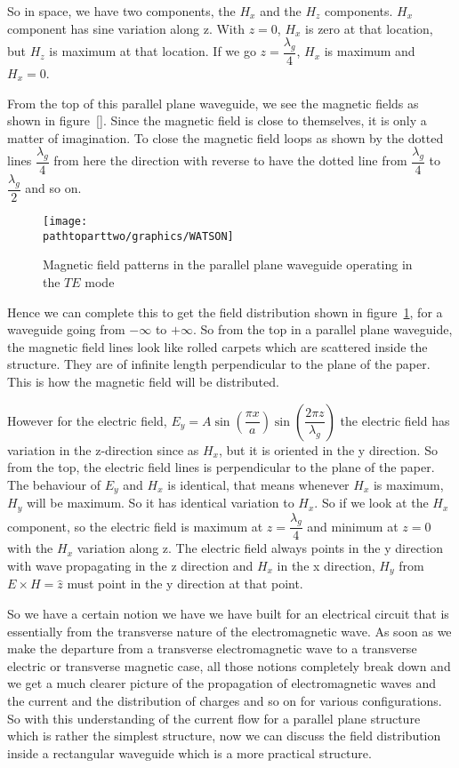 So in space, we have two components, the ${H_x}$ and the ${H_z}$ components. ${H_x}$ component has sine variation along z. With $z=0$, ${H_x}$ is zero at that location, but ${H_z}$ is maximum at that location. If we go ${z=\dfrac{\lambda_g}{4}}$, ${H_x}$ is maximum and ${H_x=0}$.

From the top of this parallel plane waveguide, we see the magnetic fields as shown in figure~\ref{}. Since the magnetic field is close to themselves, it is only a matter of imagination. To close the magnetic field loops as shown by the dotted lines ${\dfrac{\lambda_g}{4}}$ from here the direction with reverse to have the dotted line from $\dfrac{\lambda_g}{4}$  to $\dfrac{\lambda_g}{2}$ and so on.
\begin{figure}[h]
\centering
\texttt{[image: \\pathtoparttwo/graphics/WATSON]}
\caption{Magnetic field patterns in the parallel plane waveguide operating in the $TE$ mode}
\label{fig:watson}
\end{figure}

Hence we can complete this to get the field distribution shown in figure~\ref{fig:watson}, for a waveguide going from ${-\infty}$ to ${+\infty}$. So from the top in a parallel plane waveguide, the magnetic field lines look like rolled carpets which are scattered inside the structure. They are of infinite length perpendicular to the plane of the paper. This is how the magnetic field will be distributed.

However for the electric field, ${E_y= A\sin(\dfrac{\pi x}{a})\sin(\dfrac{2\pi z}{\lambda_g})}$ the electric field has variation in the z-direction since as ${H_x}$, but it is oriented in the y direction. So from the top, the electric field lines is perpendicular to the plane of the paper. The behaviour of ${E_y}$ and ${H_x}$ is identical, that means whenever ${H_x}$ is maximum, ${H_y}$ will be maximum. So it has identical variation to ${H_x}$. So if we look at the ${H_x}$ component, so the electric field is maximum at ${z= \dfrac{\lambda_g}{4}}$ and minimum at $z=0$ with the ${H_x}$ variation along z. The electric field always points in the y direction with wave propagating in the z direction and ${H_x}$ in the x direction, ${H_y}$ from ${E\times H= \hat{z}}$ must point in the y direction at that point.

So we have a certain notion we have we have built for an electrical circuit that is essentially from the transverse nature of the electromagnetic wave. As soon as we make the departure from a transverse electromagnetic wave to a transverse electric or transverse magnetic case, all those notions completely break down and we get a much clearer picture of the propagation of electromagnetic waves and the current and the distribution of charges and so on for various configurations. So with this understanding of the current flow for a parallel plane structure which is rather the simplest structure, now we can discuss the field distribution inside a rectangular waveguide which is a more practical structure.

